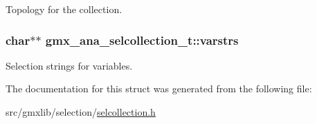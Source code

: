 \-Topology for the collection. \hypertarget{structgmx__ana__selcollection__t_ada7faddf234af8bb9f6b76a2d40f1ce0}{
\subsubsection[{varstrs}]{\setlength{\rightskip}{0pt plus 5cm}char$\ast$$\ast$ {\bf gmx\-\_\-ana\-\_\-selcollection\-\_\-t\-::varstrs}}}\label{structgmx__ana__selcollection__t_ada7faddf234af8bb9f6b76a2d40f1ce0}
\-Selection strings for variables. 

\-The documentation for this struct was generated from the following file\-:\begin{DoxyCompactItemize}
\item 
src/gmxlib/selection/\hyperlink{selcollection_8h}{selcollection.\-h}\end{DoxyCompactItemize}
